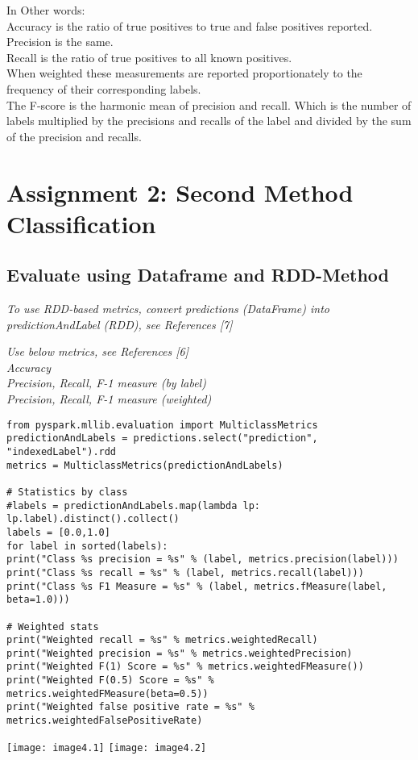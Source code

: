 \documentclass[]{article}
\begin{document}
In Other words:\\
Accuracy is the ratio of true positives to true and false positives reported. \\
Precision is the same. \\
Recall is the ratio of true positives to all known positives. \\
When weighted these measurements are reported proportionately to the frequency of their corresponding labels. \\
The F-score is the harmonic mean of precision and recall. Which is the number of labels multiplied by the precisions and recalls of the label and divided by the sum of the precision and recalls. \\

\section*{Assignment 2: Second Method Classification}

\subsection*{Evaluate using Dataframe and RDD-Method}
\emph{
To use RDD-based metrics, convert predictions (DataFrame) into predictionAndLabel (RDD), see References [7]}

\emph{
Use below metrics, see References [6] \\
	Accuracy \\
	Precision, Recall, F-1 measure (by label) \\
	Precision, Recall, F-1 measure (weighted)} \\ 
	
\begin{verbatim}
from pyspark.mllib.evaluation import MulticlassMetrics
predictionAndLabels = predictions.select("prediction", "indexedLabel").rdd
metrics = MulticlassMetrics(predictionAndLabels)

# Statistics by class
#labels = predictionAndLabels.map(lambda lp: lp.label).distinct().collect()
labels = [0.0,1.0]
for label in sorted(labels):
print("Class %s precision = %s" % (label, metrics.precision(label)))
print("Class %s recall = %s" % (label, metrics.recall(label)))
print("Class %s F1 Measure = %s" % (label, metrics.fMeasure(label, beta=1.0)))

# Weighted stats
print("Weighted recall = %s" % metrics.weightedRecall)
print("Weighted precision = %s" % metrics.weightedPrecision)
print("Weighted F(1) Score = %s" % metrics.weightedFMeasure())
print("Weighted F(0.5) Score = %s" % metrics.weightedFMeasure(beta=0.5))
print("Weighted false positive rate = %s" % metrics.weightedFalsePositiveRate)
\end{verbatim}
\texttt{[image: image4.1]}
\texttt{[image: image4.2]}
\end{document}

